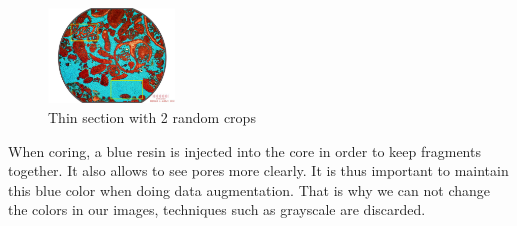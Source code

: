 \begin{figure}[h]
    \centering
        \includegraphics[width=0.3\textwidth]{./figures/03-cropping_example_with2crops}
        \caption{Thin section with 2 random crops}\label{fig:crops}
\end{figure}

When coring, a blue resin is injected into the core in order to keep fragments together. It also allows to see pores more clearly. It is thus important to maintain this blue color when doing data augmentation. That is why we can not change the colors in our images, techniques such as grayscale are discarded.


